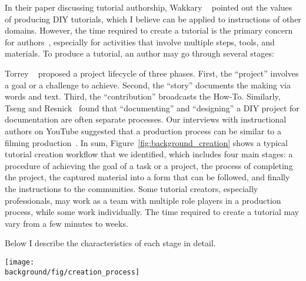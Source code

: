 In their paper discussing tutorial authorship, Wakkary \ea{}~\cite{Wakkary:2015:TAH:2702123.2702550} pointed out the values of producing DIY tutorials, which I believe can be applied to instructions of other domains. However, the time required to create a tutorial is the primary concern for authors~\cite{Kuznetsov:2010:REA:1868914.1868950,Tseng:2014:PVP:2598510.2598540}, especially for activities that involve multiple steps, tools, and materials. To produce a tutorial, an author may go through several stages:

Torrey \ea{}~\cite{Torrey:2007he} proposed a project lifecycle of three phases. First, the ``project'' involves a goal or a challenge to achieve. Second, the ``story'' documents the making via words and text. Third, the ``contribution'' broadcasts the How-To.
%
Similarly, Tseng and Resnick~\cite{Tseng:2014:PVP:2598510.2598540} found that ``documenting'' and ``designing'' a DIY project for documentation are often separate processes.
%
Our interviews with instructional authors on YouTube suggested that a production process can be similar to a filming production~\cite{Chi:2013:DGC:2501988.2502052,pincus2012the}.
%
In sum, Figure~\ref{fig:background_creation} shows a typical tutorial creation workflow that we identified, which includes four main stages:  a procedure of achieving the goal of a task or a project,  the process of completing the project,  the captured material into a form that can be followed, and finally  the instructions to the communities.
%
Some tutorial creators, especially professionals, may work as a team with multiple role players in a production process, while some work individually. The time required to create a tutorial may vary from a few minutes to weeks.

Below I describe the characteristics of each stage in detail.

\begin{figure*}[h!]
  \centering
  \texttt{[image: \\background/fig/creation\_process]}
  \caption{A common workflow of tutorial creation, which includes planning the task in detail, recording the process, editing the captured content into a readable form, and sharing with the communities.}
  \label{fig:background_creation}
\end{figure*}


